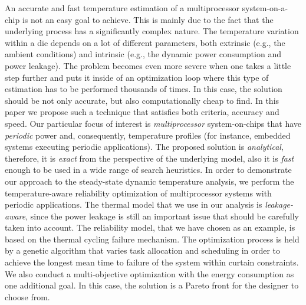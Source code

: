   An accurate and fast temperature estimation of a multiprocessor system-on-a-chip is not an easy goal to achieve. This is mainly due to the fact that the underlying process has a significantly complex nature. The temperature variation within a die depends on a lot of different parameters, both extrinsic (e.g., the ambient conditions) and intrinsic (e.g., the dynamic power consumption and power leakage). The problem becomes even more severe when one takes a little step further and puts it inside of an optimization loop where this type of estimation has to be performed thousands of times. In this case, the solution should be not only accurate, but also computationally cheap to find. In this paper we propose such a technique that satisfies both criteria, accuracy and speed.
  Our particular focus of interest is \emph{multiprocessor} system-on-chips that have \emph{periodic} power and, consequently, temperature profiles (for instance, embedded systems executing periodic applications). The proposed solution is \emph{analytical}, therefore, it is \emph{exact} from the perspective of the underlying model, also it is \emph{fast} enough to be used in a wide range of search heuristics. In order to demonstrate our approach to the steady-state dynamic temperature analysis, we perform the temperature-aware reliability optimization of multiprocessor systems with periodic applications.
  The thermal model that we use in our analysis is \emph{leakage-aware}, since the power leakage is still an important issue that should be carefully taken into account. The reliability model, that we have chosen as an example, is based on the thermal cycling failure mechanism.
  The optimization process is held by a genetic algorithm that varies task allocation and scheduling in order to achieve the longest mean time to failure of the system within curtain constraints. We also conduct a multi-objective optimization with the energy consumption as one additional goal. In this case, the solution is a Pareto front for the designer to choose from.
